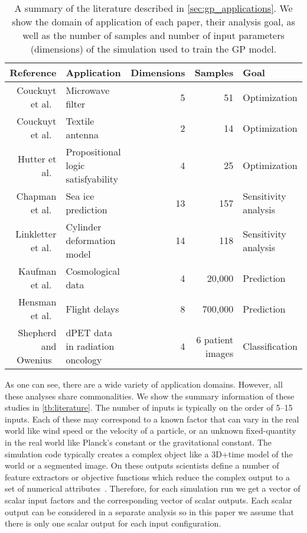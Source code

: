 \begin{table*}[htb]
\centering
\caption[A summary of the literature using Gaussian process models]{%
  A summary of the literature described in \autoref{sec:gp_applications}.  We
  show the domain of application of each paper, their analysis goal, as
  well as the number of samples and number of input parameters (dimensions)
  of the simulation used to train the GP model. 
}
\begin{tabular}{|r|lrrl|}
  \hline
  Reference & Application & Dimensions & Samples & Goal \\
  \hline
  Couckuyt et al.~\cite{Couckuyt:2010} & Microwave filter & 5 & 51 & Optimization \\
  Couckuyt et al.~\cite{Couckuyt:2010} & Textile antenna & 2 & 14 & Optimization \\
  Hutter et al.~\cite{Hutter:2010} & Propositional logic satisfyability & 4 & 25 & Optimization \\
  Chapman et al.~\cite{Chapman:1994} & Sea ice prediction & 13 & 157 & Sensitivity analysis \\
  Linkletter et al.~\cite{Linkletter:2006} & Cylinder deformation model & 14 & 118 & Sensitivity analysis \\
  Kaufman et al.~\cite{Kaufman:2011} & Cosmological data  & 4 & 20,000 & Prediction \\
  Hensman et al.~\cite{Hensman:2013} & Flight delays & 8 & 700,000 & Prediction \\
  Shepherd and Owenius~\cite{Shepherd:2012} & dPET data in radiation oncology & 4 & 6 patient images & Classification \\
  \hline
\end{tabular}
\label{tb:literature}
\end{table*}

As one can see, there are a wide variety of application domains.  However, 
all these analyses share commonalities.
We show the summary information of these studies in \autoref{tb:literature}.
The number of inputs is typically on
the order of 5--15 inputs. Each of these may correspond to a known factor that
can vary in the real world like wind speed or the velocity of a particle, or
an unknown fixed-quantity in the real world like Planck's constant or the
gravitational constant.  The simulation code typically creates a complex
object like a 3D+time model of the world or a segmented image. On these
outputs scientists define a number of feature extractors or objective
functions which reduce the complex output to a set of numerical 
attributes~\cite{Sedlmair:2014}.
Therefore, for each simulation run we get a vector of scalar input factors and
the corresponding vector of scalar outputs.  Each scalar output can be
considered in a separate analysis so in this paper we assume that there is
only one scalar output for each input configuration.


